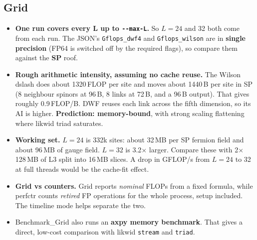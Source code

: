 \documentclass[10pt,a4paper]{article}
\begin{document}
\subsection*{Grid}
\begin{itemize}
  \item \textbf{One run covers every L up to \texttt{-{}-max-L}.} So $L=24$ and 32 both come from each run. The JSON's \texttt{Gflops\_dwf4} and \texttt{Gflops\_wilson} are in \textbf{single precision} (FP64 is switched off by the required flags), so compare them against the \textbf{SP} roof.
  \item \textbf{Rough arithmetic intensity, assuming no cache reuse.} The Wilson dslash does about 1320\,FLOP per site and moves about 1440\,B per site in SP (8 neighbour spinors at 96\,B, 8 links at 72\,B, and a 96\,B output). That gives roughly 0.9\,FLOP/B. DWF reuses each link across the fifth dimension, so its AI is higher. \textbf{Prediction: memory-bound}, with strong scaling flattening where likwid triad saturates.
  \item \textbf{Working set.} $L=24$ is 332k sites: about 32\,MB per SP fermion field and about 96\,MB of gauge field. $L=32$ is 3.2$\times$ larger. Compare these with 2$\times$128\,MB of L3 split into 16\,MB slices. A drop in GFLOP/s from $L=24$ to 32 at full threads would be the cache-fit effect.
  \item \textbf{Grid vs counters.} Grid reports \emph{nominal} FLOPs from a fixed formula, while perfctr counts \emph{retired} FP operations for the whole process, setup included. The timeline mode helps separate the two.
  \item Benchmark\_Grid also runs an \textbf{axpy memory benchmark}. That gives a direct, low-cost comparison with likwid \texttt{stream} and \texttt{triad}.
\end{itemize}
\end{document}
